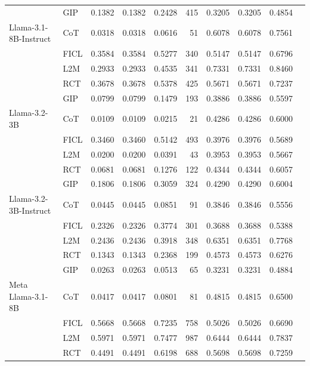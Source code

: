 \documentclass[conference]{IEEEtran}
\begin{document}
\begin{longtable}{p{3.5cm} l r r r r r r r r}
           & GIP  & 0.1382 & 0.1382 & 0.2428 & 415 & 0.3205 & 0.3205 & 0.4854 \\ \addlinespace
Llama-3.1-8B-Instruct & CoT  & 0.0318 & 0.0318 & 0.0616 & 51 & 0.6078 & 0.6078 & 0.7561 \\
                      & FICL & 0.3584 & 0.3584 & 0.5277 & 340 & 0.5147 & 0.5147 & 0.6796 \\
                      & L2M  & 0.2933 & 0.2933 & 0.4535 & 341 & 0.7331 & 0.7331 & 0.8460 \\
                      & RCT  & 0.3678 & 0.3678 & 0.5378 & 425 & 0.5671 & 0.5671 & 0.7237 \\
                      & GIP  & 0.0799 & 0.0799 & 0.1479 & 193 & 0.3886 & 0.3886 & 0.5597 \\ \addlinespace
Llama-3.2-3B & CoT  & 0.0109 & 0.0109 & 0.0215 & 21 & 0.4286 & 0.4286 & 0.6000 \\
             & FICL & 0.3460 & 0.3460 & 0.5142 & 493 & 0.3976 & 0.3976 & 0.5689 \\
             & L2M  & 0.0200 & 0.0200 & 0.0391 & 43 & 0.3953 & 0.3953 & 0.5667 \\
             & RCT  & 0.0681 & 0.0681 & 0.1276 & 122 & 0.4344 & 0.4344 & 0.6057 \\
             & GIP  & 0.1806 & 0.1806 & 0.3059 & 324 & 0.4290 & 0.4290 & 0.6004 \\ \addlinespace
Llama-3.2-3B-Instruct & CoT  & 0.0445 & 0.0445 & 0.0851 & 91 & 0.3846 & 0.3846 & 0.5556 \\
                      & FICL & 0.2326 & 0.2326 & 0.3774 & 301 & 0.3688 & 0.3688 & 0.5388 \\
                      & L2M  & 0.2436 & 0.2436 & 0.3918 & 348 & 0.6351 & 0.6351 & 0.7768 \\
                      & RCT  & 0.1343 & 0.1343 & 0.2368 & 199 & 0.4573 & 0.4573 & 0.6276 \\
                      & GIP  & 0.0263 & 0.0263 & 0.0513 & 65 & 0.3231 & 0.3231 & 0.4884 \\ \addlinespace
Meta Llama-3.1-8B & CoT  & 0.0417 & 0.0417 & 0.0801 & 81 & 0.4815 & 0.4815 & 0.6500 \\
                  & FICL & 0.5668 & 0.5668 & 0.7235 & 758 & 0.5026 & 0.5026 & 0.6690 \\
                  & L2M  & 0.5971 & 0.5971 & 0.7477 & 987 & 0.6444 & 0.6444 & 0.7837 \\
                  & RCT  & 0.4491 & 0.4491 & 0.6198 & 688 & 0.5698 & 0.5698 & 0.7259 \\

\end{longtable}
\end{document}
